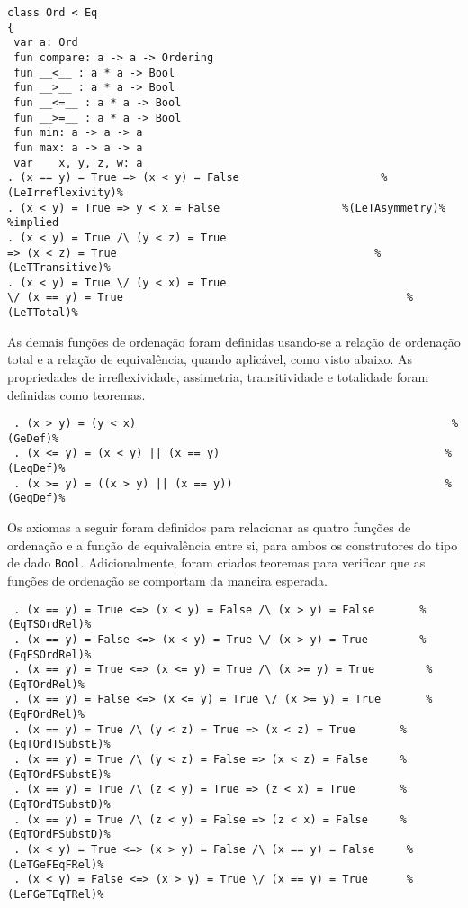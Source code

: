 \begin{Verbatim}
class Ord < Eq
{
 var a: Ord
 fun compare: a -> a -> Ordering
 fun __<__ : a * a -> Bool
 fun __>__ : a * a -> Bool
 fun __<=__ : a * a -> Bool
 fun __>=__ : a * a -> Bool
 fun min: a -> a -> a
 fun max: a -> a -> a
 var    x, y, z, w: a
. (x == y) = True => (x < y) = False                      %(LeIrreflexivity)%
. (x < y) = True => y < x = False                   %(LeTAsymmetry)% %implied
. (x < y) = True /\ (y < z) = True                 
=> (x < z) = True                                        %(LeTTransitive)%
. (x < y) = True \/ (y < x) = True                 
\/ (x == y) = True                                            %(LeTTotal)%
\end{Verbatim}

As demais funções de ordenação foram definidas usando-se a relação de ordenação total e a relação de equivalência, quando aplicável, como visto abaixo.
As propriedades de irreflexividade, assimetria, transitividade e totalidade foram definidas como teoremas.

\begin{Verbatim}
 . (x > y) = (y < x)                                                 %(GeDef)%
 . (x <= y) = (x < y) || (x == y)                                   %(LeqDef)%
 . (x >= y) = ((x > y) || (x == y))                                 %(GeqDef)%
\end{Verbatim}

Os axiomas a seguir foram definidos para relacionar as quatro funções de ordenação e a função de equivalência entre si, para ambos os construtores do tipo de dado \Verb.Bool..
Adicionalmente, foram criados teoremas para verificar que as funções de ordenação se comportam da maneira esperada.

\begin{Verbatim}
 . (x == y) = True <=> (x < y) = False /\ (x > y) = False       %(EqTSOrdRel)%
 . (x == y) = False <=> (x < y) = True \/ (x > y) = True        %(EqFSOrdRel)%
 . (x == y) = True <=> (x <= y) = True /\ (x >= y) = True        %(EqTOrdRel)%
 . (x == y) = False <=> (x <= y) = True \/ (x >= y) = True       %(EqFOrdRel)%
 . (x == y) = True /\ (y < z) = True => (x < z) = True       %(EqTOrdTSubstE)%
 . (x == y) = True /\ (y < z) = False => (x < z) = False     %(EqTOrdFSubstE)%
 . (x == y) = True /\ (z < y) = True => (z < x) = True       %(EqTOrdTSubstD)%
 . (x == y) = True /\ (z < y) = False => (z < x) = False     %(EqTOrdFSubstD)%
 . (x < y) = True <=> (x > y) = False /\ (x == y) = False     %(LeTGeFEqFRel)%
 . (x < y) = False <=> (x > y) = True \/ (x == y) = True      %(LeFGeTEqTRel)%
\end{Verbatim}

